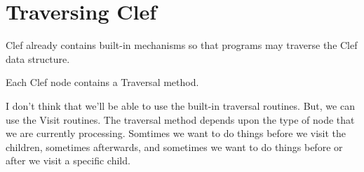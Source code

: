 
\section{Traversing Clef}

Clef already contains built-in mechanisms so that
programs may traverse the Clef data structure.


Each Clef node contains a Traversal method.

I don't think that we'll be able to use the built-in traversal
routines.  But, we can use the Visit routines.  The traversal method
depends upon the type of node that we are currently processing.
Somtimes we want to do things before we visit the children, sometimes
afterwards, and sometimes we want to do things before or after we
visit a specific child.
